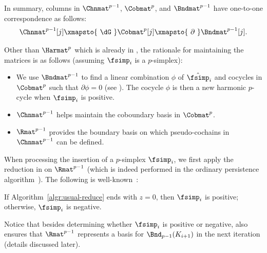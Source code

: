 In summary,
columns in   $\Chnmat^{p-1}$, $\Cobmat^{p}$,  and  $\Bndmat^{p-1}$
have one-to-one correspondence
as follows:
\[
\Chnmat^{p-1}[j]\xmapsto{\ \dG\ }\Cobmat^{p}[j]\xmapsto{\ \partial\ }\Bndmat^{p-1}[j].\]

Other than $\Harmat^p$ which is already in ,
the rationale for maintaining the matrices is as follows
(assuming $\fsimp_i$ is a $p$-simplex):
\begin{itemize}
    \item We use $\Bndmat^{p-1}$ to find a linear combination $\phi$
    of  $\hat{\fsimp}_i$ and cocycles in $\Cobmat^{p}$ 
    such that $\partial\phi=0$
    (see ).
    The cocycle $\phi$ 
    is then a new harmonic $p$-cycle when $\fsimp_i$ is positive.
    \item 
    $\Chnmat^{p-1}$ helps maintain the coboundary basis in $\Cobmat^{p}$.
    \item
     $\Rmat^{p-1}$ provides the boundary basis on which 
    pseudo-cochains in $\Chnmat^{p-1}$ can be defined.
\end{itemize}



When processing the
insertion of 
a $p$-simplex $\fsimp_i$,
we first apply the  reduction  
in 
on $\Rmat^{p-1}$
(which is indeed 
performed in the ordinary persistence algorithm~\cite{EdelsbrunnerLetscherZomorodian2002}).
The following
is  well-known~\cite{DeyWang2022,EdelsbrunnerLetscherZomorodian2002}:
\begin{proposition}
\label{prop:usual-reduce}
If 
Algorithm~\ref{algr:usual-reduce} ends with $z=0$,
then $\fsimp_i$ is positive;
otherwise, $\fsimp_i$ is negative.
\end{proposition}
Notice that besides determining whether $\fsimp_i$ is positive or negative,
also ensures that $\Rmat^{p-1}$ represents a basis for $\Bnd_{p-1}(K_{i+1})$
in the next iteration
(details discussed later).

